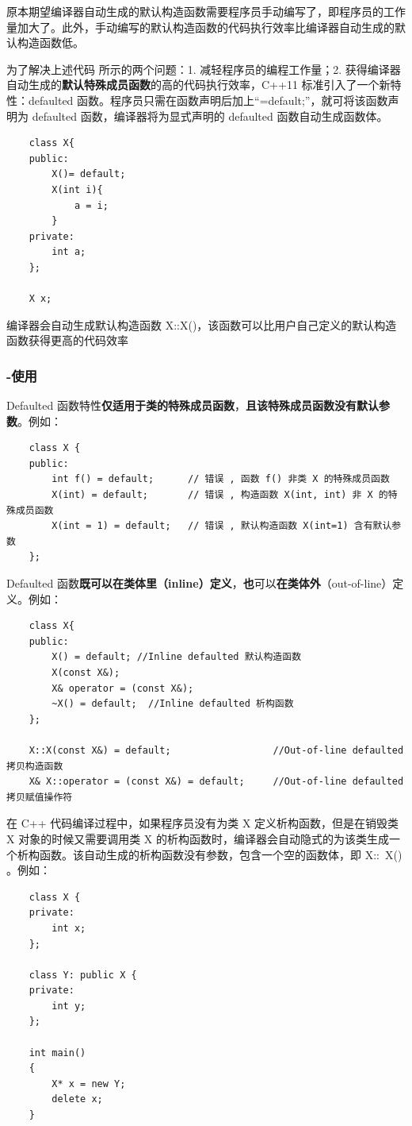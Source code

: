 \documentclass[UTF8,a4paper,12pt]{ctexbook} %
\begin{document}
				原本期望编译器自动生成的默认构造函数需要程序员手动编写了，即程序员的工作量加大了。此外，手动编写的默认构造函数的代码执行效率比编译器自动生成的默认构造函数低。
				
				为了解决上述代码 所示的两个问题：1. 减轻程序员的编程工作量；2. 获得编译器自动生成的\textbf{默认特殊成员函数}的高的代码执行效率，C++11 标准引入了一个新特性：defaulted 函数。程序员只需在函数声明后加上“=default;”，就可将该函数声明为 defaulted 函数，编译器将为显式声明的 defaulted 函数自动生成函数体。
					\begin{lstlisting}
	class X{ 
	public: 
		X()= default; 
		X(int i){ 
			a = i; 
		}     
	private: 
		int a; 
	}; 
	
	X x;						
					\end{lstlisting}
					
					编译器会自动生成默认构造函数 X::X(){}，该函数可以比用户自己定义的默认构造函数获得更高的代码效率
					
			\subsubsection{-使用}
				Defaulted 函数特性\textbf{仅适用于类的特殊成员函数}，\textbf{且该特殊成员函数没有默认参数}。例如：
				\begin{lstlisting}
	class X { 
	public: 
		int f() = default;      // 错误 , 函数 f() 非类 X 的特殊成员函数
		X(int) = default;       // 错误 , 构造函数 X(int, int) 非 X 的特殊成员函数
		X(int = 1) = default;   // 错误 , 默认构造函数 X(int=1) 含有默认参数
	};					
				\end{lstlisting}
				
				Defaulted 函数\textbf{既可以在类体里（inline）定义}，\textbf{也}可以\textbf{在类体外}（out-of-line）定义。例如：
				\begin{lstlisting}
	class X{ 
	public:  
		X() = default; //Inline defaulted 默认构造函数
		X(const X&); 
		X& operator = (const X&); 
		~X() = default;  //Inline defaulted 析构函数
	}; 
	
	X::X(const X&) = default;                  //Out-of-line defaulted 拷贝构造函数
	X& X::operator = (const X&) = default;     //Out-of-line defaulted 拷贝赋值操作符				
				\end{lstlisting}
				
				在 C++ 代码编译过程中，如果程序员没有为类 X 定义析构函数，但是在销毁类 X 对象的时候又需要调用类 X 的析构函数时，编译器会自动隐式的为该类生成一个析构函数。该自动生成的析构函数没有参数，包含一个空的函数体，即 X::~X(){ }。例如：
				\begin{lstlisting}
	class X { 
	private: 
		int x; 
	}; 
	
	class Y: public X { 
	private: 
		int y; 
	}; 
	
	int main()
	{ 
		X* x = new Y; 
		delete x; 
	}				
				\end{lstlisting}
				
\end{document}
